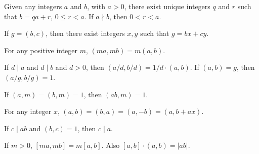 \begin{theorem}
    Given any integers $a$ and $b$,
    with $a > 0$, there exist unique integers $q$ and $r$
    such that $b = qa + r$, $0 \leq r < a$.
    If $a \nmid b$, then $0 < r < a$.
\end{theorem}

\begin{theorem}
    If $g = (b, c)$, then there exist integers
    $x, y$ such that $g = bx + cy$.
\end{theorem}

\begin{theorem}
    For any positive integer $m$, $(ma, mb) = m(a, b)$.
\end{theorem}

\begin{theorem}
    If $d \mid a$ and $d \mid b$ and $d > 0$, then
    $(a/d, b/d) = 1/d \cdot (a, b)$.
    If $(a, b) = g$, then
    $(a/g, b/g) = 1$.
\end{theorem}

\begin{theorem}
    If $(a, m) = (b, m) = 1$, then
    $(ab, m) = 1$.
\end{theorem}

\begin{theorem}
    For any integer $x$,
    $(a, b) = (b, a) = (a, -b) = (a, b + ax)$.
\end{theorem}

\begin{theorem}
    If $c \mid ab$ and $(b, c) = 1$, then $c \mid a$.
\end{theorem}

\begin{theorem}
    If $m > 0$, $[ma, mb] = m[a, b]$.
    Also $[a, b] \cdot (a, b) = |ab|$.
\end{theorem}